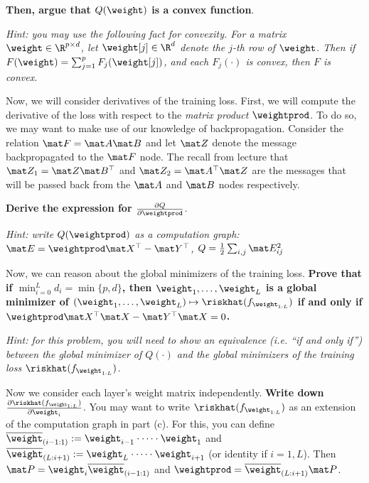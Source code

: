 \documentclass[11pt]{article}
\begin{document}
\begin{Parts}
\textbf{Then, argue that $Q(\weight)$ is a convex function}.

\emph{Hint: you may use the following fact for convexity. For a matrix $\weight \in \R^{p \times d}$, let $\weight[j] \in \R^{d}$ denote the $j$-th row of $\weight$. Then if $F(\weight) = \sum_{j=1}^p F_j(\weight[j])$, and each $F_j(\cdot)$ is convex, then $F$ is convex.} 

\begin{tcolorbox}[breakable]
\end{tcolorbox}

\Part
Now, we will consider derivatives of the training loss. First, we will compute the derivative of the loss with respect to the \emph{matrix product} $\weightprod$.
To do so, we may want to make use of our knowledge of backpropagation. Consider the relation $\mat F = \mat A \mat B$ and let $\mat Z$ denote the message backpropagated to the $\mat F$ node. The recall from lecture that 
$\mat Z_1 = \mat Z \mat B^\top $ and $\mat Z_2 = \mat A^\top\mat Z$ are the messages that will be passed back from the $\mat A$ and $\mat B$ nodes respectively. 

\textbf{Derive the expression for $\frac{\partial Q}{\partial \weightprod}$}.

\emph{Hint: write $Q(\weightprod)$ as a computation graph: $\mat E = \weightprod \mat X^\top -\mat Y^\top$, $Q = \frac{1}{2}\sum_{i,j}\mat E_{ij}^2$}

\begin{tcolorbox}[breakable]
\end{tcolorbox}

	\Part
	Now, we can reason about the global minimizers of the training loss.
	\textbf{Prove that if $\min_{i=0}^L d_i = \min\{p,d\}$, then $\weight_1,\dots,\weight_L$ is a global minimizer of $(\weight_1,\dots,\weight_L) \mapsto \riskhat(f_{\weight_{1:L}})$ if and only if $ \weightprod\mat X^\top\mat X - \mat Y^\top \mat X = 0$. }

	\emph{Hint: for this problem, you will need to show an equivalence (i.e. ``if and only if'') between the global minimizer of $Q(\cdot)$ and the global minimizers of the training loss $\riskhat(f_{\weight_{1:L}})$. }

\begin{tcolorbox}[breakable]
\end{tcolorbox}

\Part
Now we consider each layer's weight matrix independently. 
\textbf{Write down $\frac{\partial \riskhat(f_{\weight_{1:L}})}{\partial \weight_i}$}.
You may want to write $\riskhat(f_{\weight_{1:L}})$ as an extension of the computation graph in part (c). For this, you can define $\overline{\weight}_{(i-1:1)} := \weight_{i-1} \cdot \dots \cdot \weight_{1}$ and $\overline{\weight}_{(L:i+1)} := \weight_{L} \cdot \dots \cdot \weight_{i+1}$ (or identity if $i  = 1,L$). 
Then $\mat P = \weight_i\overline{\weight}_{(i-1:1)}$ and $\weightprod = \overline{\weight}_{(L:i+1)}\mat P $.



\end{Parts}
\end{document}
